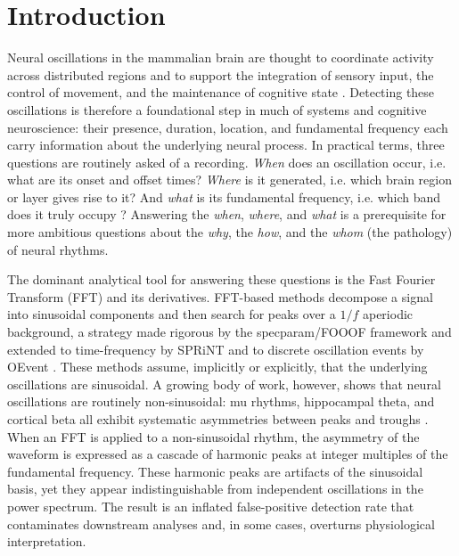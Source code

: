 
\section{Introduction}

Neural oscillations in the mammalian brain are thought to coordinate activity across distributed regions and to support the integration of sensory input, the control of movement, and the maintenance of cognitive state \citep{buzsaki2004neuronal,fries2015rhythms,giraud2012cortical,jensen2010shaping}. Detecting these oscillations is therefore a foundational step in much of systems and cognitive neuroscience: their presence, duration, location, and fundamental frequency each carry information about the underlying neural process. In practical terms, three questions are routinely asked of a recording. \emph{When} does an oscillation occur, i.e. what are its onset and offset times? \emph{Where} is it generated, i.e. which brain region or layer gives rise to it? And \emph{what} is its fundamental frequency, i.e. which band does it truly occupy \citep{buzsaki2004neuronal,pfurtscheller1999eventrelated}? Answering the \emph{when}, \emph{where}, and \emph{what} is a prerequisite for more ambitious questions about the \emph{why}, the \emph{how}, and the \emph{whom} (the pathology) of neural rhythms.

The dominant analytical tool for answering these questions is the Fast Fourier Transform (FFT) and its derivatives. FFT-based methods decompose a signal into sinusoidal components and then search for peaks over a $1/f$ aperiodic background, a strategy made rigorous by the specparam/FOOOF framework \citep{donoghue2020parameterizing} and extended to time-frequency by SPRiNT \citep{wilson2022sprint} and to discrete oscillation events by OEvent \citep{neymotin2022oevent}. These methods assume, implicitly or explicitly, that the underlying oscillations are sinusoidal. A growing body of work, however, shows that neural oscillations are routinely non-sinusoidal: mu rhythms, hippocampal theta, and cortical beta all exhibit systematic asymmetries between peaks and troughs \citep{belluscio2012crossfrequency,cole2017waveform,cole2019cycle,donoghue2022methodological}. When an FFT is applied to a non-sinusoidal rhythm, the asymmetry of the waveform is expressed as a cascade of harmonic peaks at integer multiples of the fundamental frequency. These harmonic peaks are artifacts of the sinusoidal basis, yet they appear indistinguishable from independent oscillations in the power spectrum. The result is an inflated false-positive detection rate that contaminates downstream analyses and, in some cases, overturns physiological interpretation.

